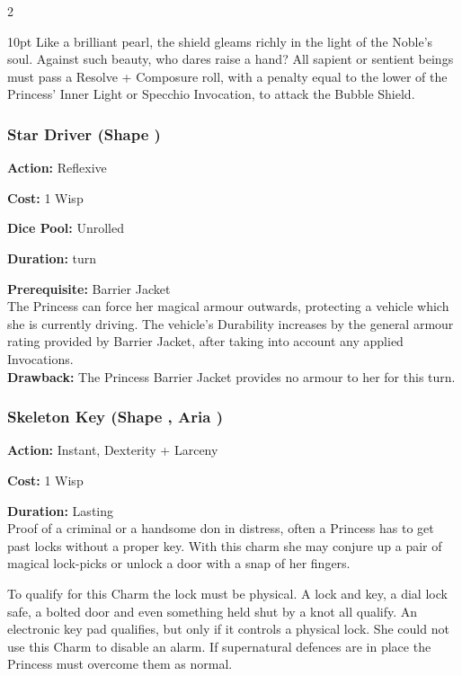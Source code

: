 \begin{multicols}{2}
\begin{myindentpar}{10pt}
Like a brilliant pearl, the shield gleams richly in the light of the Noble's soul. Against such beauty, who dares raise a hand? All sapient or sentient beings must pass a Resolve + Composure roll, with a penalty equal to the lower of the Princess' Inner Light or Specchio Invocation, to attack the Bubble Shield.\end{myindentpar}

\subsubsection*{Star Driver (Shape \textbullet)}

\noindent \textbf{Action:} Reflexive

\noindent \textbf{Cost:} 1 Wisp

\noindent \textbf{Dice Pool:} Unrolled

\noindent \textbf{Duration:} turn 

\noindent \textbf{Prerequisite:} Barrier Jacket \\

\noindent The Princess can force her magical armour outwards, protecting a vehicle which she is currently driving. The vehicle's Durability increases by the general armour rating provided by Barrier Jacket, after taking into account any applied Invocations. \\

\textbf{Drawback:} The Princess Barrier Jacket provides no armour to her for this turn. 

\subsubsection*{Skeleton Key (Shape \textbullet, Aria \textbullet)}

\noindent \textbf{Action:} Instant, Dexterity + Larceny

\noindent \textbf{Cost:} 1 Wisp

\noindent \textbf{Duration:} Lasting \\

\noindent Proof of a criminal or a handsome don in distress, often a Princess has to get past locks without a proper key. With this charm she may conjure up a pair of magical lock-picks or unlock a door with a snap of her fingers. 

To qualify for this Charm the lock must be physical. A lock and key, a dial lock safe, a bolted door and even something held shut by a knot all qualify. An electronic key pad qualifies, but only if it controls a physical lock. She could not use this Charm to disable an alarm. If supernatural defences are in place the Princess must overcome them as normal. 


\end{multicols}

